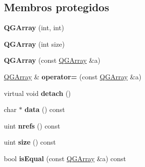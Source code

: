 \subsection*{Membros protegidos}
\begin{DoxyCompactItemize}
\item 
\hypertarget{class_q_g_array_aca13f91a8de3ba2a3dfcff04c262e472}{{\bfseries Q\-G\-Array} (int, int)}\label{class_q_g_array_aca13f91a8de3ba2a3dfcff04c262e472}

\item 
\hypertarget{class_q_g_array_ad27bee89809c59e27d65102d2074a3b3}{{\bfseries Q\-G\-Array} (int size)}\label{class_q_g_array_ad27bee89809c59e27d65102d2074a3b3}

\item 
\hypertarget{class_q_g_array_a7411bf9fee9db8a763193b448c15432e}{{\bfseries Q\-G\-Array} (const \hyperlink{class_q_g_array}{Q\-G\-Array} \&a)}\label{class_q_g_array_a7411bf9fee9db8a763193b448c15432e}

\item 
\hypertarget{class_q_g_array_aa6f31af67ea6c7b078d3e04d2fc56b40}{\hyperlink{class_q_g_array}{Q\-G\-Array} \& {\bfseries operator=} (const \hyperlink{class_q_g_array}{Q\-G\-Array} \&a)}\label{class_q_g_array_aa6f31af67ea6c7b078d3e04d2fc56b40}

\item 
\hypertarget{class_q_g_array_ac295bade8aee589f6718dfa79edc2a34}{virtual void {\bfseries detach} ()}\label{class_q_g_array_ac295bade8aee589f6718dfa79edc2a34}

\item 
\hypertarget{class_q_g_array_a64387f3930dd82dd501286b663be0dd6}{char $\ast$ {\bfseries data} () const }\label{class_q_g_array_a64387f3930dd82dd501286b663be0dd6}

\item 
\hypertarget{class_q_g_array_af039b996f5fd2708ee64084d6e867649}{uint {\bfseries nrefs} () const }\label{class_q_g_array_af039b996f5fd2708ee64084d6e867649}

\item 
\hypertarget{class_q_g_array_a7e63723212bed1ca52f0fe57e58b812e}{uint {\bfseries size} () const }\label{class_q_g_array_a7e63723212bed1ca52f0fe57e58b812e}

\item 
\hypertarget{class_q_g_array_a563673ca2663a52fe6195dd15b595703}{bool {\bfseries is\-Equal} (const \hyperlink{class_q_g_array}{Q\-G\-Array} \&a) const }\label{class_q_g_array_a563673ca2663a52fe6195dd15b595703}


\end{DoxyCompactItemize}
